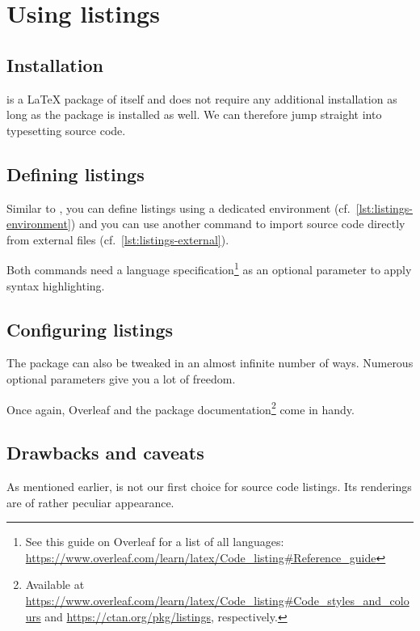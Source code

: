 \newpage
\section{Using listings}

\subsection{Installation}
 is a \LaTeX{} package of itself and does not require any additional installation as long as the  package is installed as well.
We can therefore jump straight into typesetting source code.

\subsection{Defining listings}
Similar to , you can define listings using a dedicated environment (cf.\ \cref{lst:listings-environment}) and you can use another command to import source code directly from external files (cf.\ \cref{lst:listings-external}).


\noindent Both commands need a language specification\footnote{See this guide on Overleaf for a list of all languages: \url{https://www.overleaf.com/learn/latex/Code_listing\#Reference_guide}} as an optional parameter to apply syntax highlighting.

\subsection{Configuring listings}
The  package can also be tweaked in an almost infinite number of ways.
Numerous optional parameters give you a lot of freedom.

Once again, Overleaf and the package documentation\footnote{Available at \url{https://www.overleaf.com/learn/latex/Code_listing\#Code_styles_and_colours} and \url{https://ctan.org/pkg/listings}, respectively.} come in handy.


\subsection{Drawbacks and caveats}
As mentioned earlier,  is not our first choice for source code listings.
Its renderings are of rather peculiar appearance. 

